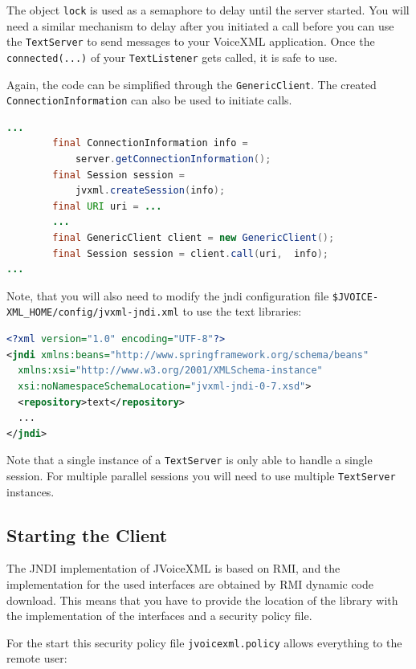 \documentclass[11pt,a4paper]{book}
\begin{document}
The object \lstinline[language=Java]{lock} is used as a semaphore to delay until
the server started. You will need a similar mechanism to delay after you
initiated a call before you can use the \lstinline{TextServer} to send messages
to your VoiceXML application. Once the \lstinline{connected(...)} of your
\lstinline{TextListener} gets called, it is safe to use.

Again, the code can be simplified through the \lstinline{GenericClient}.
The created \lstinline{ConnectionInformation} can also be used to initiate
calls.
 \begin{lstlisting}[language=Java]
 ...
        final ConnectionInformation info =
            server.getConnectionInformation();
        final Session session = 
            jvxml.createSession(info);
        final URI uri = ...
        ...
        final GenericClient client = new GenericClient();
        final Session session = client.call(uri,  info);
...
\end{lstlisting}

Note, that you will also need to modify the jndi configuration file
\texttt{\${JVOICE-} \texttt{XML\_HOME}/config/jvxml-jndi.xml} to use the text
libraries:

\begin{lstlisting}[language=XML]
<?xml version="1.0" encoding="UTF-8"?>
<jndi xmlns:beans="http://www.springframework.org/schema/beans"
  xmlns:xsi="http://www.w3.org/2001/XMLSchema-instance"
  xsi:noNamespaceSchemaLocation="jvxml-jndi-0-7.xsd">
  <repository>text</repository>
  ...
</jndi>
\end{lstlisting}

Note that a single instance of a \lstinline{TextServer} is only able to handle
a single session. For multiple parallel sessions you will need to use multiple 
\lstinline{TextServer} instances.

\subsection{Starting the Client}
\label{sec:starting-client}

The JNDI implementation of JVoiceXML is based on RMI, and
the implementation for the used interfaces are obtained by
RMI dynamic code download. This means that you have to provide
the location of the library with the implementation of the
interfaces and a security policy file.

For the start this security policy file \texttt{jvoicexml.policy}
allows everything to the remote user:
\end{document}
